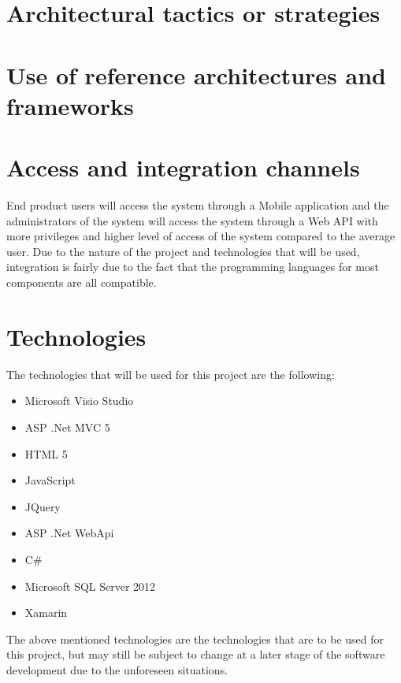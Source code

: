 \documentclass[11pt,titlepage]{article} %
\begin{document}
\section{Architectural tactics or strategies}

\section{Use of reference architectures and frameworks}

\section{Access and integration channels}
End product users will access the system through a Mobile application and the administrators of the system will access the system through a Web API with more privileges and higher level of access of the system compared to the average user. Due to the nature of the project and technologies that will be used, integration is fairly due to the fact that the programming languages for most components are all compatible.

\section{Technologies}
The technologies that will be used  for this project are the following:
\begin{itemize}
	\item{Microsoft Visio Studio}
	\item{ASP .Net MVC 5}
	\item{HTML 5}
	\item{JavaScript}
	\item{JQuery}
	\item{ASP .Net WebApi}
	\item{C\#}
	\item{Microsoft SQL Server 2012}
	\item{Xamarin}
	\end{itemize}
The above mentioned technologies are the technologies that are to be used for this project, but may still be subject to change at a later stage of the software development due to the unforeseen situations. 
\end{document}
